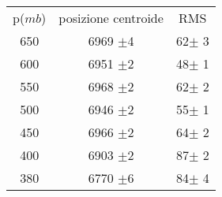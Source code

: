 \begin{center}
\begin{tabulary}{\textwidth}{CCC}
\toprule
p($mb$) &  posizione centroide & RMS \\
650 &6969 $\pm$4 &62$\pm$ 3\\
600 &6951 $\pm$2 &48$\pm$ 1\\
550 &6968 $\pm$2 &62$\pm$ 2\\
500 &6946 $\pm$2 &55$\pm$ 1\\
450 &6966 $\pm$2 &64$\pm$ 2\\
400 &6903 $\pm$2 &87$\pm$ 2\\
380 &6770 $\pm$6 &84$\pm$ 4\\
\bottomrule
\end{tabulary}
\end{center}